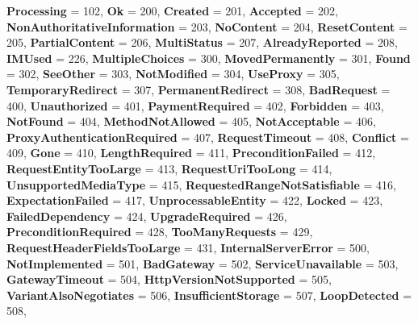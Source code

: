 \begin{DoxyCompactItemize}
{\bfseries Processing} = 102, 
{\bfseries Ok} = 200, 
{\bfseries Created} = 201, 
\newline
{\bfseries Accepted} = 202, 
{\bfseries Non\+Authoritative\+Information} = 203, 
{\bfseries No\+Content} = 204, 
{\bfseries Reset\+Content} = 205, 
\newline
{\bfseries Partial\+Content} = 206, 
{\bfseries Multi\+Status} = 207, 
{\bfseries Already\+Reported} = 208, 
{\bfseries I\+M\+Used} = 226, 
\newline
{\bfseries Multiple\+Choices} = 300, 
{\bfseries Moved\+Permanently} = 301, 
{\bfseries Found} = 302, 
{\bfseries See\+Other} = 303, 
\newline
{\bfseries Not\+Modified} = 304, 
{\bfseries Use\+Proxy} = 305, 
{\bfseries Temporary\+Redirect} = 307, 
{\bfseries Permanent\+Redirect} = 308, 
\newline
{\bfseries Bad\+Request} = 400, 
{\bfseries Unauthorized} = 401, 
{\bfseries Payment\+Required} = 402, 
{\bfseries Forbidden} = 403, 
\newline
{\bfseries Not\+Found} = 404, 
{\bfseries Method\+Not\+Allowed} = 405, 
{\bfseries Not\+Acceptable} = 406, 
{\bfseries Proxy\+Authentication\+Required} = 407, 
\newline
{\bfseries Request\+Timeout} = 408, 
{\bfseries Conflict} = 409, 
{\bfseries Gone} = 410, 
{\bfseries Length\+Required} = 411, 
\newline
{\bfseries Precondition\+Failed} = 412, 
{\bfseries Request\+Entity\+Too\+Large} = 413, 
{\bfseries Request\+Uri\+Too\+Long} = 414, 
{\bfseries Unsupported\+Media\+Type} = 415, 
\newline
{\bfseries Requested\+Range\+Not\+Satisfiable} = 416, 
{\bfseries Expectation\+Failed} = 417, 
{\bfseries Unprocessable\+Entity} = 422, 
{\bfseries Locked} = 423, 
\newline
{\bfseries Failed\+Dependency} = 424, 
{\bfseries Upgrade\+Required} = 426, 
{\bfseries Precondition\+Required} = 428, 
{\bfseries Too\+Many\+Requests} = 429, 
\newline
{\bfseries Request\+Header\+Fields\+Too\+Large} = 431, 
{\bfseries Internal\+Server\+Error} = 500, 
{\bfseries Not\+Implemented} = 501, 
{\bfseries Bad\+Gateway} = 502, 
\newline
{\bfseries Service\+Unavailable} = 503, 
{\bfseries Gateway\+Timeout} = 504, 
{\bfseries Http\+Version\+Not\+Supported} = 505, 
{\bfseries Variant\+Also\+Negotiates} = 506, 
\newline
{\bfseries Insufficient\+Storage} = 507, 
{\bfseries Loop\+Detected} = 508, 

\end{DoxyCompactItemize}
